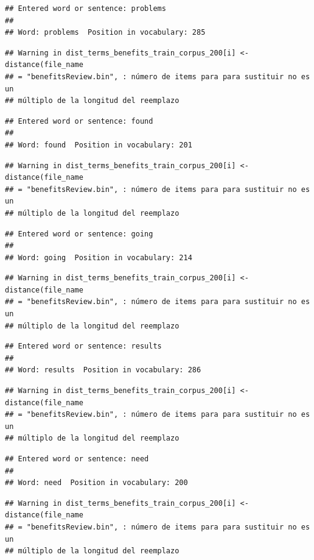 \documentclass[spanish,]{article}
\begin{document}
\begin{verbatim}
## Entered word or sentence: problems
## 
## Word: problems  Position in vocabulary: 285
\end{verbatim}

\begin{verbatim}
## Warning in dist_terms_benefits_train_corpus_200[i] <- distance(file_name
## = "benefitsReview.bin", : número de items para para sustituir no es un
## múltiplo de la longitud del reemplazo
\end{verbatim}

\begin{verbatim}
## Entered word or sentence: found
## 
## Word: found  Position in vocabulary: 201
\end{verbatim}

\begin{verbatim}
## Warning in dist_terms_benefits_train_corpus_200[i] <- distance(file_name
## = "benefitsReview.bin", : número de items para para sustituir no es un
## múltiplo de la longitud del reemplazo
\end{verbatim}

\begin{verbatim}
## Entered word or sentence: going
## 
## Word: going  Position in vocabulary: 214
\end{verbatim}

\begin{verbatim}
## Warning in dist_terms_benefits_train_corpus_200[i] <- distance(file_name
## = "benefitsReview.bin", : número de items para para sustituir no es un
## múltiplo de la longitud del reemplazo
\end{verbatim}

\begin{verbatim}
## Entered word or sentence: results
## 
## Word: results  Position in vocabulary: 286
\end{verbatim}

\begin{verbatim}
## Warning in dist_terms_benefits_train_corpus_200[i] <- distance(file_name
## = "benefitsReview.bin", : número de items para para sustituir no es un
## múltiplo de la longitud del reemplazo
\end{verbatim}

\begin{verbatim}
## Entered word or sentence: need
## 
## Word: need  Position in vocabulary: 200
\end{verbatim}

\begin{verbatim}
## Warning in dist_terms_benefits_train_corpus_200[i] <- distance(file_name
## = "benefitsReview.bin", : número de items para para sustituir no es un
## múltiplo de la longitud del reemplazo
\end{verbatim}
\end{document}
